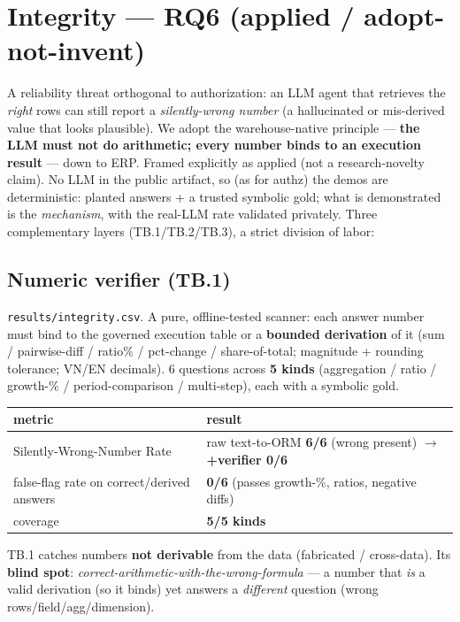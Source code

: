 \documentclass[11pt,a4paper]{article}
\newcommand{\code}[1]{\texttt{#1}}
\begin{document}
\section{Integrity --- RQ6 (applied / adopt-not-invent)}
A reliability threat orthogonal to authorization: an LLM agent that retrieves the \emph{right} rows can still
report a \emph{silently-wrong number} (a hallucinated or mis-derived value that looks plausible). We adopt the
warehouse-native principle --- \textbf{the LLM must not do arithmetic; every number binds to an execution
result} --- down to ERP. Framed explicitly as applied (not a research-novelty claim). No LLM in the public
artifact, so (as for authz) the demos are deterministic: planted answers + a trusted symbolic gold; what is
demonstrated is the \emph{mechanism}, with the real-LLM rate validated privately. Three complementary layers
(TB.1/TB.2/TB.3), a strict division of labor:

\subsection{Numeric verifier (TB.1)}
\code{results/integrity.csv}. A pure, offline-tested scanner: each answer number must bind to the governed
execution table or a \textbf{bounded derivation} of it (sum / pairwise-diff / ratio\% / pct-change /
share-of-total; magnitude + rounding tolerance; VN/EN decimals). 6 questions across \textbf{5 kinds}
(aggregation / ratio / growth-\% / period-comparison / multi-step), each with a symbolic gold.

\begin{center}\small
\begin{tabular}{@{}ll@{}}
\toprule
metric & result \\
\midrule
Silently-Wrong-Number Rate & raw text-to-ORM \textbf{6/6} (wrong present) $\to$ \textbf{+verifier 0/6} \\
false-flag rate on correct/derived answers & \textbf{0/6} (passes growth-\%, ratios, negative diffs) \\
coverage & \textbf{5/5 kinds} \\
\bottomrule
\end{tabular}
\end{center}

TB.1 catches numbers \textbf{not derivable} from the data (fabricated / cross-data). Its \textbf{blind spot}:
\emph{correct-arithmetic-with-the-wrong-formula} --- a number that \emph{is} a valid derivation (so it binds)
yet answers a \emph{different} question (wrong rows/field/agg/dimension).
\end{document}
